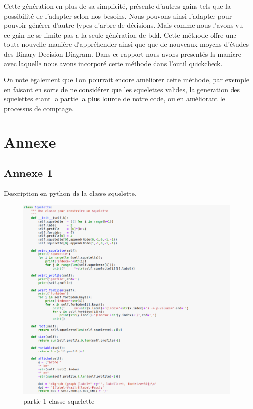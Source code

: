 \documentclass[french]{article}
\begin{document}
Cette génération en plus de sa simplicité, présente d'autres gains tels que la possibilité de l'adapter selon nos besoins. Nous pouvons ainsi l'adapter pour pouvoir générer d'autre types d'arbre de décisions.
Mais comme nous l'avons vu ce gain ne se limite pas a la seule génération de bdd. Cette méthode offre une toute nouvelle manière d'appréhender ainsi que que de nouveaux moyens d'études des Binary Decision Diagram. Dans ce rapport nous avons presentés la maniere avec laquelle nous avons incorporé cette méthode dans l'outil quickcheck.

On note également que l'on pourrait encore améliorer cette méthode, par exemple en faisant en sorte de ne considérer que les squelettes valides, la generation des squelettes etant la partie la plus lourde de notre code, ou en améliorant le processus de comptage. 
\newpage
\section{Annexe}
\subsection{Annexe 1}
\label{Annexe_1}
Description en python de la classe squelette. 

\begin{figure}[H]
    \centering
    \includegraphics[scale=0.4]{part1_squelette.png}
    \caption{partie 1 classe squelette}
    \label{fig:squelette1}
\end{figure}
\end{document}
